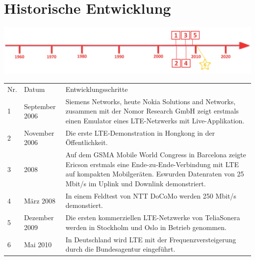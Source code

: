 \section*{Historische Entwicklung}
\includegraphics[width=\textwidth]{Kapitel/4GLTE/Grafiken/Zeitstrahl.png}
\par
\noindent
{}
\begin{tabular}{p{0.5 cm}p{1.5 cm}p{15.55 cm}}
	Nr. & Datum & Entwicklungsschritte\\
	1 & September 2006 & Siemens Networks, heute Nokia Solutions and Networks, zusammen mit der Nomor Research GmbH zeigt erstmals einen Emulator eines LTE-Netzwerks mit Live-Applikation.\\
	2 & November 2006 & Die erste LTE-Demonstration in Hongkong in der Öffentlichkeit.\\
	3 & 2008 & Auf dem GSMA Mobile World Congress in Barcelona zeigte Ericson erstmals eine Ende-zu-Ende-Verbindung mit LTE auf kompakten Mobilgeräten. Eswurden Datenraten von 25 Mbit/s im Uplink und Downlink demonstriert.\\
	4 & März 2008  & In einem Feldtest von NTT DoCoMo werden 250 Mbit/s demonstiert.\\
	5 & Dezember 2009 & Die ersten kommerziellen LTE-Netzwerke von TeliaSonera werden in Stockholm und Oslo in Betrieb genommen.\\
	6 & Mai 2010 & In Deutschland wird LTE mit der Frequenzversteigerung durch die Bundesagentur eingeführt.\\
\end{tabular}
\par
